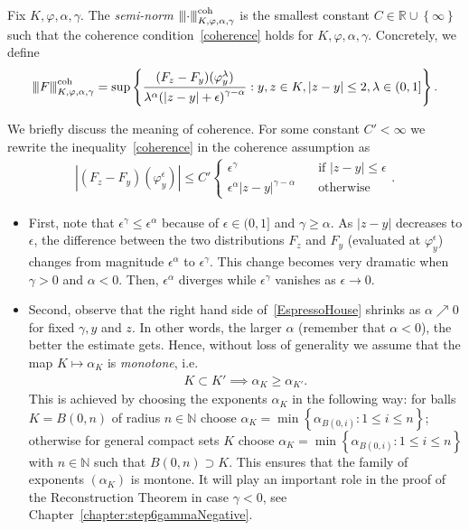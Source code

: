 Fix \(K, \varphi, \alpha, \gamma\). The \emph{semi-norm \({\left\vert\kern-0.25ex\left\vert\kern-0.25ex\left\vert\cdot \right\vert\kern-0.25ex\right\vert\kern-0.25ex\right\vert}^{\mathrm{coh}}_{K,\varphi,\alpha,\gamma}\)} is the smallest constant \(C \in \mathbb{R} \cup \left\{ \infty \right\}\) such that the coherence condition~\eqref{coherence} holds for \(K, \varphi, \alpha, \gamma\). Concretely, we define
\begin{align*}
    \vertiii{F}^{\mathrm{coh}}_{K,\varphi,\alpha,\gamma} = \sup \left\{ \frac{(F_z - F_y)(\varphi^\lambda_y)}{\lambda^\alpha{(|z-y| + \epsilon)}^{\gamma - \alpha}} : y,z \in K, |z-y| \leq 2, \lambda \in (0,1] \right\}. %
\end{align*}

We briefly discuss the meaning of coherence. For some constant \( C' < \infty \) we rewrite the inequality~\eqref{coherence} in the coherence assumption as
\begin{align}\label{EspressoHouse}
    |(F_z - F_y)(\varphi^\epsilon_y)| \leq C' \begin{cases}
        \epsilon^\gamma \quad & \text{if \(|z-y| \leq \epsilon\)} \\
        \epsilon^{\alpha} |z-y|^{\gamma - \alpha} \quad & \text{otherwise}
    \end{cases}.
\end{align}
\begin{itemize}
    \item First, note that \(\epsilon^{\gamma} \leq \epsilon^{\alpha}\) because of \(\epsilon \in (0,1] \) and \(\gamma \geq \alpha\). As \(|z-y|\) decreases to \(\epsilon\), the difference between the two distributions \(F_z\) and \(F_y\) (evaluated at \(\varphi^\epsilon_y\)) changes from magnitude \(\epsilon^\alpha\) to \(\epsilon^{\gamma}\). This change becomes very dramatic when \(\gamma > 0\) and \(\alpha < 0\). Then, \(\epsilon^{\alpha}\) diverges while \(\epsilon^{\gamma}\) vanishes as \(\epsilon \to 0\).
    \item Second, observe that the right hand side of~\eqref{EspressoHouse} shrinks as \(\alpha \nearrow 0\) for fixed \(\gamma, y\) and \(z\). In other words, the larger \(\alpha\) (remember that \(\alpha < 0\)), the better the estimate gets. Hence, without loss of generality we assume that the map \(K \mapsto \alpha_K\) is \emph{monotone}, i.e. 
    \begin{align}\label{alpha-monotone}
        K \subset K' \implies \alpha_K \geq \alpha_{K'}.
    \end{align}
    This is achieved by choosing the exponents \(\alpha_K\) in the following way: for balls \(K = B(0,n)\) of radius \(n \in \mathbb{N}\) choose \(\alpha_K = \min\left\{ \alpha_{B(0,i)}  : 1\leq i \leq n\right\}\); otherwise for general compact sets \(K\) choose \(\alpha_K = \min\left\{ \alpha_{B(0,i)}  : 1\leq i \leq n\right\}\) with \(n \in \mathbb{N}\) such that  \(B(0,n) \supset K\). This ensures that the family of exponents \((\alpha_K)\) is montone. It will play an important role in the proof of the Reconstruction Theorem in case \(\gamma < 0\), see Chapter~\ref{chapter:step6gammaNegative}.
\end{itemize}

